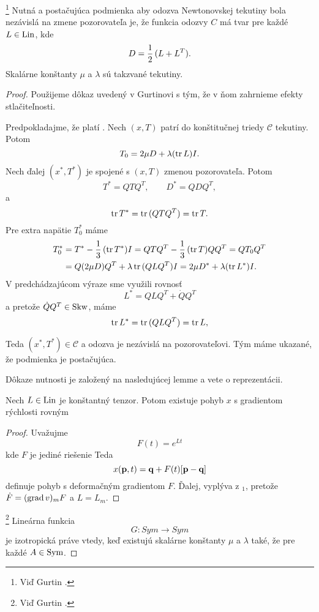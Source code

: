 \footnote{Viď Gurtin \cite[s. 149]{gurtin}.}
Nutná a postačujúca podmienka aby odozva Newtonovskej tekutiny bola
nezávislá na zmene pozorovateľa je, že funkcia odozvy $C$ má tvar
pre každé $L \in \mbox{Lin}$, kde $$D=\frac{1}{2}\,(L+L^T).$$
Skalárne konštanty $\mu$ a $\lambda$ sú takzvané  tekutiny.
\begin{proof}
Použijeme dôkaz uvedený v Gurtinovi s tým, že v ňom zahrnieme efekty stlačiteľnosti. 

Predpokladajme, že platí . Nech $(x,T)$ patrí do konštitučnej
triedy $\mathcal C$ tekutiny. Potom $$T_0=2\mu D+\lambda (\mbox{tr}\,L)I.$$
Nech ďalej $(x^*,T^*)$ je spojené s $(x,T)$ zmenou pozorovateľa. Potom
$$T^*=QTQ^T,\qquad D^*=QDQ^T,$$
a
$$\mbox{tr}\,T^*=\mbox{tr}\,(QTQ^T)=\mbox{tr}\,T.$$
Pre extra napätie $T_0^*$ máme 
\[
\begin{split}
T^*_0&=T^*-\frac{1}{3}\,(\mbox{tr}\,T^*)I=QTQ^T-\frac{1}{3}\,(\mbox{tr}\,T)QQ^T=QT_0Q^T\\
&=Q(2\mu D)Q^T + \lambda\,\mbox{tr}\,(QLQ^T)I = 2\mu D^* + \lambda(\mbox{tr}\,L^*)I.
\end{split}
\]
V predchádzajúcom výraze sme využili rovnosť
$$L^*=QLQ^T+\dot{Q}Q^T$$ a pretože $\dot{Q}Q^T \in \mbox{Skw}$, máme
$$\mbox{tr}\,L^*=\mbox{tr}\,(QLQ^T)=\mbox{tr}\,L,$$

Teda $(x^*,T^*)\in \mathcal C$ a odozva je nezávislá na pozorovateľovi. Tým máme
ukazané, že podmienka  je postačujúca.

Dôkaze nutnosti je založený na nasledujúcej lemme a vete o reprezentácii. 

 Nech $L \in \mbox{Lin}$ je konštantný tenzor. 
Potom existuje pohyb $x$ s gradientom rýchlosti rovným 
\begin{proof}
Uvažujme $$F(t)=e^{Lt}$$
kde $F$ je jediné riešenie
Teda
$$x(\textbf{p},t)=\textbf{q}+F(t)[\textbf{p}-\textbf{q}]$$
definuje pohyb s deformačným gradientom $F$. Ďalej, 
vyplýva z $_1$, pretože $\dot F=(\mbox{grad}\,v)_mF$ a $L=L_m$.
\end{proof}

\footnote{Viď Gurtin
\cite[s. 235]{gurtin}.} 
Lineárna funkcia
$$  G:Sym \rightarrow Sym $$
je izotropická práve vtedy, keď existujú skalárne konštanty $\mu$ a $\lambda$
také, že
pre každé $A \in \mbox{Sym}$.


\end{proof}
